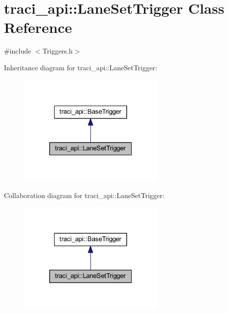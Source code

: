 \hypertarget{classtraci__api_1_1_lane_set_trigger}{}\section{traci\+\_\+api\+:\+:Lane\+Set\+Trigger Class Reference}
\label{classtraci__api_1_1_lane_set_trigger}


{\ttfamily \#include $<$Triggers.\+h$>$}



Inheritance diagram for traci\+\_\+api\+:\+:Lane\+Set\+Trigger\+:\nopagebreak
\begin{figure}[H]
\begin{center}
\leavevmode
\includegraphics[width=205pt]{classtraci__api_1_1_lane_set_trigger__inherit__graph}
\end{center}
\end{figure}


Collaboration diagram for traci\+\_\+api\+:\+:Lane\+Set\+Trigger\+:\nopagebreak
\begin{figure}[H]
\begin{center}
\leavevmode
\includegraphics[width=205pt]{classtraci__api_1_1_lane_set_trigger__coll__graph}
\end{center}
\end{figure}
